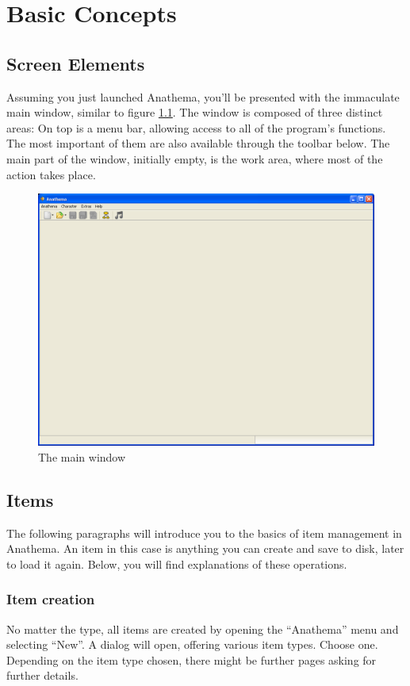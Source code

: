 
\chapter{Basic Concepts}

\section{Screen Elements}
Assuming you just launched Anathema, you'll be presented with the immaculate main window, similar to figure \ref{fig:MainWindow}. The window is composed of three distinct areas: On top is a menu bar, allowing access to all of the program's functions. The most important of them are also available through the toolbar below. The main part of the window, initially empty, is the work area, where most of the action takes place.

\begin{figure}[h]
	\centering
		\includegraphics[width=1.00\textwidth]{images/MainWindow.png}
	\caption{The main window}
	\label{fig:MainWindow}
\end{figure}

\section{Items}
The following paragraphs will introduce you to the basics of item management in Anathema. An item in this case is anything 
you can create and save to disk, later to load it again. Below, you will find explanations of these operations.

\subsection{Item creation}
No matter the type, all items are created by opening the ``Anathema'' menu and selecting ``New''. A dialog will open, offering various item types. Choose one. Depending on the item type chosen, there might be further pages asking for further details.

